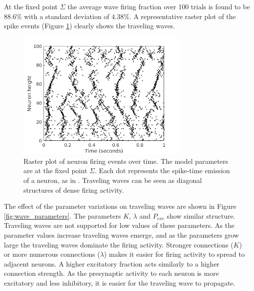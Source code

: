 \documentclass[a4paper,11pt]{article}
\begin{document}
At the fixed point $\Sigma$ the average wave firing fraction over 100 trials is found to be $88.6\%$ with a standard deviation of $4.38\%$.
A representative raster plot of the spike events (Figure \ref{fig:sigma_raster}) clearly shows the traveling waves.
\begin{figure}[!htb]
 \centering
 \includegraphics[width=0.75\textwidth]{fig/baseline}
 \caption{Raster plot of neuron firing events over time. The model parameters are at the fixed point $\Sigma$. Each dot represents the spike-time emission of a neuron, as in \cite{senk2020}. Traveling waves can be seen as diagonal structures of dense firing activity. }
 \label{fig:sigma_raster}
\end{figure}

The effect of the parameter variations on traveling waves are shown in Figure \ref{fig:wave_parameters}.
The parameters $K$, $\lambda$ and $P_{exc}$ show similar structure.
Traveling waves are not supported for low values of these parameters.
As the parameter values increase traveling waves emerge, and as the parameters grow large the traveling waves dominate the firing activity.
Stronger connections ($K$) or more numerous connections ($\lambda$) makes it easier for firing activity to spread to adjacent neurons.
A higher excitatory fraction acts similarly to a higher connection strength. 
As the presynaptic activity to each neuron is more excitatory and less inhibitory, it is easier for the traveling wave to propagate.
\end{document}
